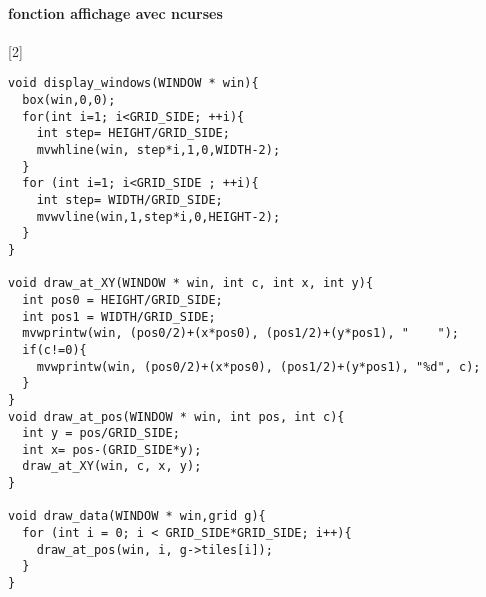 \documentclass{report}
\begin{document}
\paragraph{fonction affichage avec ncurses}[2]
\begin{lstlisting}
void display_windows(WINDOW * win){
  box(win,0,0);
  for(int i=1; i<GRID_SIDE; ++i){
    int step= HEIGHT/GRID_SIDE;
    mvwhline(win, step*i,1,0,WIDTH-2);
  }
  for (int i=1; i<GRID_SIDE ; ++i){
    int step= WIDTH/GRID_SIDE;
    mvwvline(win,1,step*i,0,HEIGHT-2);
  }
}

void draw_at_XY(WINDOW * win, int c, int x, int y){
  int pos0 = HEIGHT/GRID_SIDE;
  int pos1 = WIDTH/GRID_SIDE;
  mvwprintw(win, (pos0/2)+(x*pos0), (pos1/2)+(y*pos1), "    ");
  if(c!=0){
    mvwprintw(win, (pos0/2)+(x*pos0), (pos1/2)+(y*pos1), "%d", c);
  }
}
void draw_at_pos(WINDOW * win, int pos, int c){
  int y = pos/GRID_SIDE;
  int x= pos-(GRID_SIDE*y);
  draw_at_XY(win, c, x, y);
}

void draw_data(WINDOW * win,grid g){
  for (int i = 0; i < GRID_SIDE*GRID_SIDE; i++){
    draw_at_pos(win, i, g->tiles[i]);
  }
}
\end{lstlisting}
\end{document}
